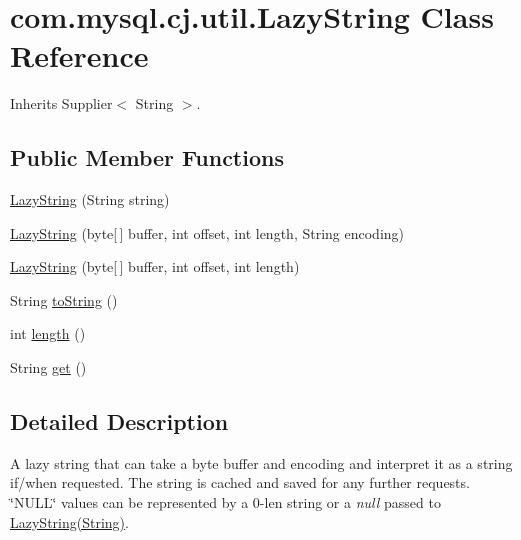 \hypertarget{classcom_1_1mysql_1_1cj_1_1util_1_1_lazy_string}{}\section{com.\+mysql.\+cj.\+util.\+Lazy\+String Class Reference}
\label{classcom_1_1mysql_1_1cj_1_1util_1_1_lazy_string}


Inherits Supplier$<$ String $>$.

\subsection*{Public Member Functions}
\begin{DoxyCompactItemize}
\item 
\mbox{\hyperlink{classcom_1_1mysql_1_1cj_1_1util_1_1_lazy_string_a35e42f1528797d95f7d136a743ebb715}{Lazy\+String}} (String string)
\item 
\mbox{\hyperlink{classcom_1_1mysql_1_1cj_1_1util_1_1_lazy_string_af6a71f4638561312d98f625211b94a28}{Lazy\+String}} (byte\mbox{[}$\,$\mbox{]} buffer, int offset, int length, String encoding)
\item 
\mbox{\hyperlink{classcom_1_1mysql_1_1cj_1_1util_1_1_lazy_string_a217eff2af32cb57ef5307c96e45e621b}{Lazy\+String}} (byte\mbox{[}$\,$\mbox{]} buffer, int offset, int length)
\item 
String \mbox{\hyperlink{classcom_1_1mysql_1_1cj_1_1util_1_1_lazy_string_a25acdb668b2966e6e99764dd08177869}{to\+String}} ()
\item 
int \mbox{\hyperlink{classcom_1_1mysql_1_1cj_1_1util_1_1_lazy_string_aba17c82b57c45d15d1d8ec1ba9581a2a}{length}} ()
\item 
String \mbox{\hyperlink{classcom_1_1mysql_1_1cj_1_1util_1_1_lazy_string_ac58f7776e68ba38901a9aa8a356d4adb}{get}} ()
\end{DoxyCompactItemize}


\subsection{Detailed Description}
A lazy string that can take a byte buffer and encoding and interpret it as a string if/when requested. The string is cached and saved for any further requests. \char`\"{}\+N\+U\+L\+L\char`\"{} values can be represented by a 0-\/len string or a {\itshape null} passed to \mbox{\hyperlink{classcom_1_1mysql_1_1cj_1_1util_1_1_lazy_string_a35e42f1528797d95f7d136a743ebb715}{Lazy\+String(\+String)}}. 

